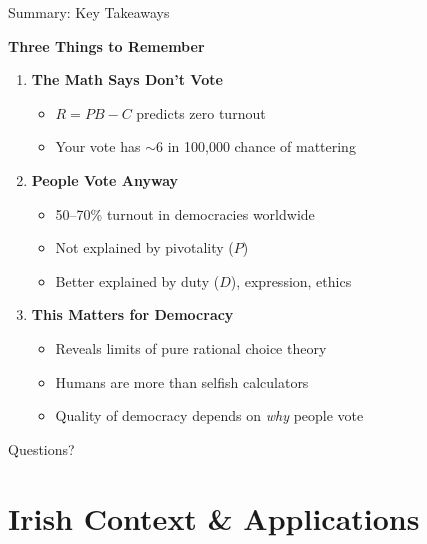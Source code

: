 \documentclass[10pt]{beamer}
\begin{document}
\begin{frame}{Summary: Key Takeaways}
\begin{center}
\Large \textbf{Three Things to Remember}
\end{center}

\begin{enumerate}
\item \textbf{The Math Says Don't Vote}
\begin{itemize}
\item $R = PB - C$ predicts zero turnout
\item Your vote has $\sim$6 in 100,000 chance of mattering
\end{itemize}

\vspace{0.5cm}

\item \textbf{People Vote Anyway}
\begin{itemize}
\item 50--70\% turnout in democracies worldwide
\item Not explained by pivotality ($P$)
\item Better explained by duty ($D$), expression, ethics
\end{itemize}

\vspace{0.5cm}

\item \textbf{This Matters for Democracy}
\begin{itemize}
\item Reveals limits of pure rational choice theory
\item Humans are more than selfish calculators
\item Quality of democracy depends on \emph{why} people vote
\end{itemize}
\end{enumerate}
\end{frame}

\begin{frame}[standout]
Questions?
\end{frame}


\section{Irish Context \& Applications}
\end{document}
